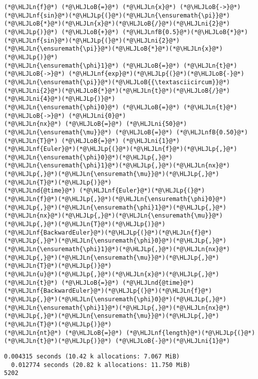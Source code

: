 \documentclass[12pt,a4paper]{article}
\newcommand{\HLJLn}[1]{#1}
\newcommand{\HLJLnd}[1]{\textcolor[RGB]{214,102,97}{#1}}
\newcommand{\HLJLnf}[1]{\textcolor[RGB]{66,102,213}{#1}}
\newcommand{\HLJLnfB}[1]{\textcolor[RGB]{59,151,46}{#1}}
\newcommand{\HLJLni}[1]{\textcolor[RGB]{59,151,46}{#1}}
\newcommand{\HLJLoB}[1]{\textcolor[RGB]{102,102,102}{\textbf{#1}}}
\newcommand{\HLJLp}[1]{#1}
\begin{document}
\begin{lstlisting}
(*@\HLJLn{f}@*) (*@\HLJLoB{=}@*) (*@\HLJLn{x}@*) (*@\HLJLoB{->}@*) (*@\HLJLnf{sin}@*)(*@\HLJLp{(}@*)(*@\HLJLn{\ensuremath{\pi}}@*)(*@\HLJLoB{*}@*)(*@\HLJLn{x}@*)(*@\HLJLoB{/}@*)(*@\HLJLni{2}@*)(*@\HLJLp{)}@*) (*@\HLJLoB{+}@*) (*@\HLJLnfB{0.5}@*)(*@\HLJLoB{*}@*)(*@\HLJLnf{sin}@*)(*@\HLJLp{(}@*)(*@\HLJLni{2}@*)(*@\HLJLn{\ensuremath{\pi}}@*)(*@\HLJLoB{*}@*)(*@\HLJLn{x}@*)(*@\HLJLp{)}@*)
(*@\HLJLn{\ensuremath{\phi}1}@*) (*@\HLJLoB{=}@*) (*@\HLJLn{t}@*) (*@\HLJLoB{->}@*) (*@\HLJLnf{exp}@*)(*@\HLJLp{(}@*)(*@\HLJLoB{-}@*)(*@\HLJLn{\ensuremath{\pi}}@*)(*@\HLJLoB{{\textasciicircum}}@*)(*@\HLJLni{2}@*)(*@\HLJLoB{*}@*)(*@\HLJLn{t}@*)(*@\HLJLoB{/}@*)(*@\HLJLni{4}@*)(*@\HLJLp{)}@*)
(*@\HLJLn{\ensuremath{\phi}0}@*) (*@\HLJLoB{=}@*) (*@\HLJLn{t}@*) (*@\HLJLoB{->}@*) (*@\HLJLni{0}@*)
(*@\HLJLn{nx}@*) (*@\HLJLoB{=}@*) (*@\HLJLni{50}@*)
(*@\HLJLn{\ensuremath{\mu}}@*) (*@\HLJLoB{=}@*) (*@\HLJLnfB{0.50}@*)
(*@\HLJLn{T}@*) (*@\HLJLoB{=}@*) (*@\HLJLni{1}@*)
(*@\HLJLnf{Euler}@*)(*@\HLJLp{(}@*)(*@\HLJLn{f}@*)(*@\HLJLp{,}@*)(*@\HLJLn{\ensuremath{\phi}0}@*)(*@\HLJLp{,}@*)(*@\HLJLn{\ensuremath{\phi}1}@*)(*@\HLJLp{,}@*)(*@\HLJLn{nx}@*)(*@\HLJLp{,}@*)(*@\HLJLn{\ensuremath{\mu}}@*)(*@\HLJLp{,}@*)(*@\HLJLn{T}@*)(*@\HLJLp{)}@*)
(*@\HLJLnd{@time}@*) (*@\HLJLnf{Euler}@*)(*@\HLJLp{(}@*)(*@\HLJLn{f}@*)(*@\HLJLp{,}@*)(*@\HLJLn{\ensuremath{\phi}0}@*)(*@\HLJLp{,}@*)(*@\HLJLn{\ensuremath{\phi}1}@*)(*@\HLJLp{,}@*)(*@\HLJLn{nx}@*)(*@\HLJLp{,}@*)(*@\HLJLn{\ensuremath{\mu}}@*)(*@\HLJLp{,}@*)(*@\HLJLn{T}@*)(*@\HLJLp{)}@*)
(*@\HLJLnf{BackwardEuler}@*)(*@\HLJLp{(}@*)(*@\HLJLn{f}@*)(*@\HLJLp{,}@*)(*@\HLJLn{\ensuremath{\phi}0}@*)(*@\HLJLp{,}@*)(*@\HLJLn{\ensuremath{\phi}1}@*)(*@\HLJLp{,}@*)(*@\HLJLn{nx}@*)(*@\HLJLp{,}@*)(*@\HLJLn{\ensuremath{\mu}}@*)(*@\HLJLp{,}@*)(*@\HLJLn{T}@*)(*@\HLJLp{)}@*)
(*@\HLJLn{u}@*)(*@\HLJLp{,}@*)(*@\HLJLn{x}@*)(*@\HLJLp{,}@*)(*@\HLJLn{t}@*) (*@\HLJLoB{=}@*) (*@\HLJLnd{@time}@*) (*@\HLJLnf{BackwardEuler}@*)(*@\HLJLp{(}@*)(*@\HLJLn{f}@*)(*@\HLJLp{,}@*)(*@\HLJLn{\ensuremath{\phi}0}@*)(*@\HLJLp{,}@*)(*@\HLJLn{\ensuremath{\phi}1}@*)(*@\HLJLp{,}@*)(*@\HLJLn{nx}@*)(*@\HLJLp{,}@*)(*@\HLJLn{\ensuremath{\mu}}@*)(*@\HLJLp{,}@*)(*@\HLJLn{T}@*)(*@\HLJLp{)}@*)
(*@\HLJLn{nt}@*) (*@\HLJLoB{=}@*) (*@\HLJLnf{length}@*)(*@\HLJLp{(}@*)(*@\HLJLn{t}@*)(*@\HLJLp{)}@*) (*@\HLJLoB{-}@*)(*@\HLJLni{1}@*)
\end{lstlisting}

\begin{lstlisting}
0.004315 seconds (10.42 k allocations: 7.067 MiB)
  0.012774 seconds (20.82 k allocations: 11.750 MiB)
5202
\end{lstlisting}
\end{document}
